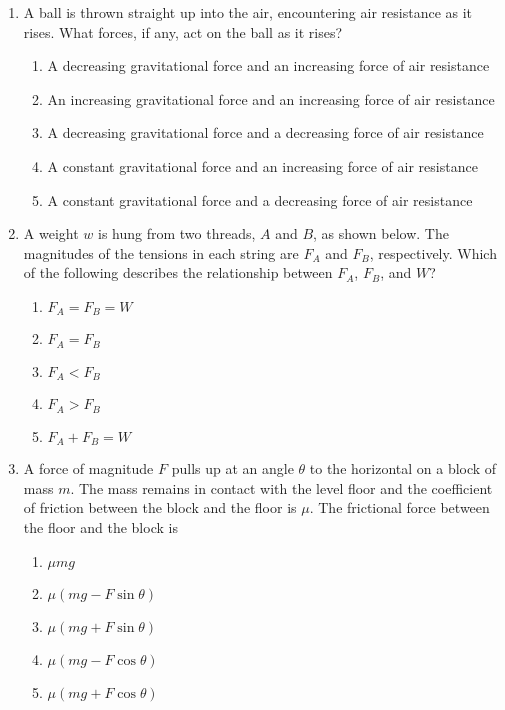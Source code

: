 \documentclass{../../../oss-apphys}
\begin{document}
\begin{multicols}{2}
\begin{enumerate}[resume,leftmargin=18pt]
  \item A ball is thrown straight up into the air, encountering air resistance
    as it rises. What forces, if any, act on the ball as it rises?
    \begin{enumerate}[noitemsep,topsep=0pt,leftmargin=18pt,label=(\Alph*)]
    \item A decreasing gravitational force and an increasing force of air
      resistance
    \item An increasing gravitational force and an increasing force of air
      resistance
    \item A decreasing gravitational force and a decreasing force of air
      resistance
    \item A constant gravitational force and an increasing force of air
      resistance
    \item A constant gravitational force and a decreasing force of air
      resistance
    \end{enumerate}
    
  \item A weight $w$ is hung from two threads, $A$ and $B$, as shown below. The
    magnitudes of the tensions in each string are $F_A$ and $F_B$, respectively.
    Which of the following describes the relationship between $F_A$, $F_B$, and
    $W$?
    \begin{center}
    \end{center}
    \begin{enumerate}[noitemsep,topsep=0pt,leftmargin=18pt,label=(\Alph*)]
    \item $F_A=F_B=W$
    \item $F_A=F_B$
    \item $F_A<F_B$
    \item $F_A>F_B$
    \item $F_A+F_B=W$
    \end{enumerate}

  \item A force of magnitude $F$ pulls up at an angle $\theta$ to the
    horizontal on a block of mass $m$. The mass remains in contact with the
    level floor and the coefficient of friction between the block and the floor
    is $\mu$. The frictional force between the floor and the block is
    \begin{center}
    \end{center}
    \begin{enumerate}[noitemsep,topsep=0pt,leftmargin=18pt,label=(\Alph*)]
    \item$\mu mg$
    \item$\mu (mg-F\sin\theta)$
    \item$\mu (mg+F\sin\theta)$
    \item$\mu (mg-F\cos\theta)$
    \item$\mu (mg+F\cos\theta)$
    \end{enumerate}    
  \end{enumerate}
  \columnbreak
  

\end{multicols}
\end{document}
